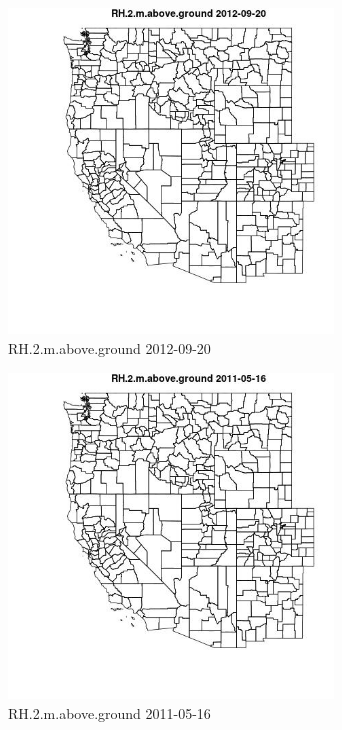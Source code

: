\begin{figure} 
\centering  
\includegraphics[width=0.77\textwidth]{Code_Outputs/ML_input_report_ML_input_PM25_Step5_part_d_de_duplicated_aves_ML_input_MapObsRH2maboveground2012-09-20.jpg} 
\caption{\label{fig:ML_input_report_ML_input_PM25_Step5_part_d_de_duplicated_aves_ML_inputMapObsRH2maboveground2012-09-20}RH.2.m.above.ground 2012-09-20} 
\end{figure} 
 

\begin{figure} 
\centering  
\includegraphics[width=0.77\textwidth]{Code_Outputs/ML_input_report_ML_input_PM25_Step5_part_d_de_duplicated_aves_ML_input_MapObsRH2maboveground2011-05-16.jpg} 
\caption{\label{fig:ML_input_report_ML_input_PM25_Step5_part_d_de_duplicated_aves_ML_inputMapObsRH2maboveground2011-05-16}RH.2.m.above.ground 2011-05-16} 
\end{figure} 
 

